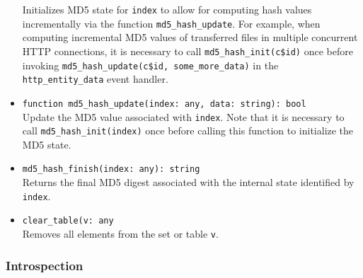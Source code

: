 \documentclass[10pt,landscape]{article}
\begin{document}
\begin{multicols*}{2}
\begin{itemize}
    Initializes MD5 state for \texttt{index} to allow for computing hash values
    incrementally via the function \verb|md5_hash_update|. For example, when
    computing incremental MD5 values of transferred files in multiple
    concurrent HTTP connections, it is necessary to call
    \verb|md5_hash_init(c$id)| once before invoking
    \verb|md5_hash_update(c$id, some_more_data)| in the \verb|http_entity_data|
    event handler.
  \item \verb|function md5_hash_update(index: any, data: string): bool|\\
    Update the MD5 value associated with \texttt{index}. Note that it is
    necessary to call \verb|md5_hash_init(index)| once before calling this
    function to initialize the MD5 state.
  \item \verb|md5_hash_finish(index: any): string|\\
    Returns the final MD5 digest associated with the internal state identified
    by \texttt{index}.
  \item \verb|clear_table(v: any|\\
    Removes all elements from the set or table \texttt{v}.
\end{itemize}

\subsubsection*{Introspection}


\end{multicols*}
\end{document}
